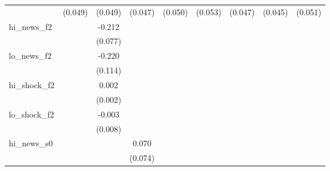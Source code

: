 {\begin{tabular}{l*{8}{c}}
            &     (0.049)         &     (0.049)         &     (0.047)         &     (0.050)         &     (0.053)         &     (0.047)         &     (0.045)         &     (0.051)         \\
\addlinespace
hi\_news\_f2  &                     &      -0.212\sym{***}&                     &                     &                     &                     &                     &                     \\
            &                     &     (0.077)         &                     &                     &                     &                     &                     &                     \\
\addlinespace
lo\_news\_f2  &                     &      -0.220\sym{*}  &                     &                     &                     &                     &                     &                     \\
            &                     &     (0.114)         &                     &                     &                     &                     &                     &                     \\
\addlinespace
hi\_shock\_f2 &                     &       0.002         &                     &                     &                     &                     &                     &                     \\
            &                     &     (0.002)         &                     &                     &                     &                     &                     &                     \\
\addlinespace
lo\_shock\_f2 &                     &      -0.003         &                     &                     &                     &                     &                     &                     \\
            &                     &     (0.008)         &                     &                     &                     &                     &                     &                     \\
\addlinespace
hi\_news\_s0  &                     &                     &       0.070         &                     &                     &                     &                     &                     \\
            &                     &                     &     (0.074)         &                     &                     &                     &                     &                     \\

\end{tabular}}
